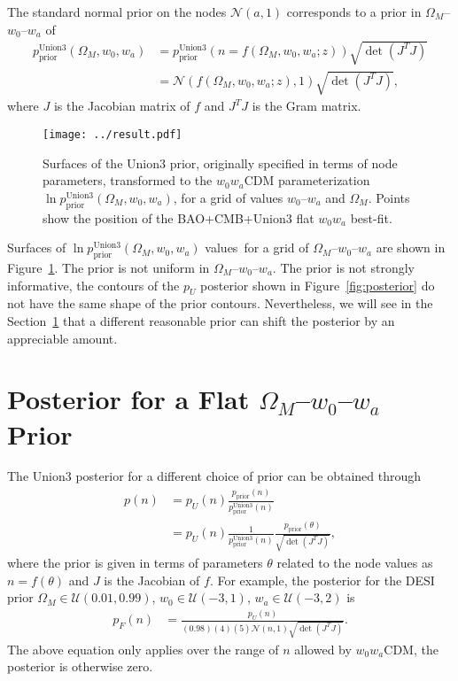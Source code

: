 \documentclass{aastex631}
\begin{document}
The standard normal prior on the nodes $\mathcal{N}(a,1)$ corresponds to a prior in  $\Omega_M$--$w_0$--$w_a$ of
\begin{align}
p^\text{Union3}_\text{prior}(\Omega_M, w_0,w_a)  & =p^\text{Union3}_\text{prior}(n=f(\Omega_M, w_0, w_a; z))  \sqrt{\det{\left(J^T J\right)}} \\
& = \mathcal{N}(f(\Omega_M, w_0, w_a; z),1)  \sqrt{\det{\left(J^T J\right)}}, \label{eq:Union3prior}
\end{align}
where $J$ is the Jacobian matrix of $f$ and $J^TJ$ is the Gram matrix.

\begin{figure}[htbp] %
   \centering
   \texttt{[image: ../result.pdf]} 
   \caption{Surfaces of the Union3 prior, originally specified in terms of node parameters, transformed to the $w_0w_a$CDM parameterization
   $\ln{p^\text{Union3}_\text{prior}}(\Omega_M, w_0,w_a)$,  for a grid of values
 $w_0$--$w_a$ and $\Omega_M$.   
   Points show the position of the BAO+CMB+Union3 flat $w_0w_a$ best-fit.}
   \label{fig:priors}
\end{figure}

Surfaces of  $\ln{p^\text{Union3}_\text{prior}}(\Omega_M, w_0,w_a)$ values\ for a grid of $\Omega_M$--$w_0$--$w_a$ are shown in
Figure~\ref{fig:priors}.   The prior is not uniform in  $\Omega_M$--$w_0$--$w_a$.
The prior is not strongly informative, the contours of the $p_U$
posterior shown in Figure~\ref{fig:posterior} do not have the same shape of the prior contours.  Nevertheless,
we will see in the  Section~\ref{sec:flatposterior} that a different reasonable prior can shift the posterior
by an appreciable amount.

\section{Posterior for a Flat  $\Omega_M$--$w_0$--$w_a$  Prior}
\label{sec:flatposterior}
The Union3  posterior for a different choice of prior can be obtained through
\begin{align}
p(n) & = p_U(n)\frac{p_\text{prior}(n)}{p^\text{Union3}_\text{prior}(n)}\\
 & = p_U(n) \frac{1}{p^\text{Union3}_\text{prior}(n) } \frac{p_\text{prior}(\theta)}{ \sqrt{\det{\left(J^T J\right)}}} ,
\end{align}
where the prior is given in terms of parameters $\theta$
related to the node values as $n=f(\theta)$ and $J$ is the Jacobian of $f$.
For example, 
the posterior for the 
DESI prior $\Omega_M \in \mathcal{U}(0.01,0.99)$, $w_0 \in \mathcal{U}(-3,1)$, $w_a \in \mathcal{U}(-3,2)$
is
\begin{align}
p_F(n) 
& = \frac{p_U(n)}{(0.98)(4)(5) \mathcal{N}(n,1)  \sqrt{\det{\left(J^T J\right)}}}.
\label{eq:flatprior}
\end{align}
The above equation only applies over the range of $n$ allowed by  $w_0w_a$CDM, the posterior is otherwise zero.
\end{document}
